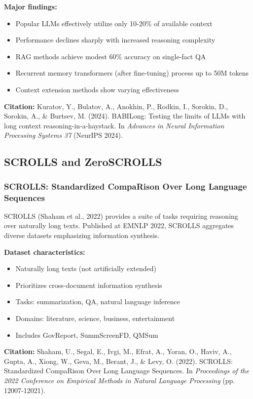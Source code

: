 \documentclass[11pt]{article}
\begin{document}
\textbf{Major findings:}
\begin{itemize}[leftmargin=*]
    \item Popular LLMs effectively utilize only 10-20\% of available context
    \item Performance declines sharply with increased reasoning complexity
    \item RAG methods achieve modest 60\% accuracy on single-fact QA
    \item Recurrent memory transformers (after fine-tuning) process up to 50M tokens
    \item Context extension methods show varying effectiveness
\end{itemize}

\textbf{Citation:} Kuratov, Y., Bulatov, A., Anokhin, P., Rodkin, I., Sorokin, D., Sorokin, A., \& Burtsev, M. (2024). BABILong: Testing the limits of LLMs with long context reasoning-in-a-haystack. In \textit{Advances in Neural Information Processing Systems 37} (NeurIPS 2024).

\subsection{SCROLLS and ZeroSCROLLS}

\subsubsection{SCROLLS: Standardized CompaRison Over Long Language Sequences}

SCROLLS (Shaham et al., 2022) provides a suite of tasks requiring reasoning over naturally long texts. Published at EMNLP 2022, SCROLLS aggregates diverse datasets emphasizing information synthesis.

\textbf{Dataset characteristics:}
\begin{itemize}[leftmargin=*]
    \item Naturally long texts (not artificially extended)
    \item Prioritizes cross-document information synthesis
    \item Tasks: summarization, QA, natural language inference
    \item Domains: literature, science, business, entertainment
    \item Includes GovReport, SummScreenFD, QMSum
\end{itemize}

\textbf{Citation:} Shaham, U., Segal, E., Ivgi, M., Efrat, A., Yoran, O., Haviv, A., Gupta, A., Xiong, W., Geva, M., Berant, J., \& Levy, O. (2022). SCROLLS: Standardized CompaRison Over Long Language Sequences. In \textit{Proceedings of the 2022 Conference on Empirical Methods in Natural Language Processing} (pp. 12007-12021).
\end{document}
